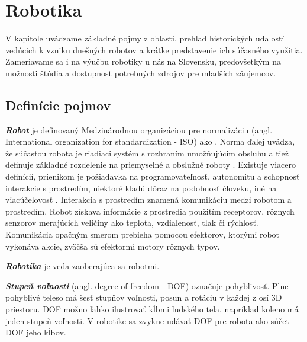 \chapter{Robotika}

\label{kap:robotika}

V kapitole uvádzame základné pojmy z oblasti, prehľad historických udalostí vedúcich k vzniku dnešných robotov a krátke predstavenie ich súčasného využitia. Zameriavame sa i na výučbu robotiky u nás na Slovensku, predovšetkým na možnosti štúdia a dostupnosť potrebných zdrojov pre mladších záujemcov.

\section{Definície pojmov}
\textbf{\textit{Robot}} je definovaný Medzinárodnou organizáciou pre normalizáciu (angl. International organization for standardization - ISO) ako . Norma ďalej uvádza, že súčasťou robota je riadiaci systém s rozhraním umožňujúcim obsluhu a tiež definuje základné rozdelenie na priemyselné a obslužné roboty \cite{ISORobot}. Existuje viacero definícií, prienikom je požiadavka na programovateľnosť, autonomitu a schopnosť interakcie s prostredím, niektoré kladú dôraz na podobnosť človeku, iné na viacúčelovosť \cite{RoboticsAndAutomationHandbook}. Interakcia s prostredím znamená komunikáciu medzi robotom a prostredím. Robot získava informácie z prostredia použitím receptorov, rôznych senzorov merajúcich veličiny ako teplota, vzdialenosť, tlak či rýchlosť. Komunikácia opačným smerom prebieha pomocou efektorov, ktorými robot vykonáva akcie, zväčša sú efektormi motory rôznych typov.

\textbf{\textit{Robotika}} je veda zaoberajúca sa robotmi.

\textbf{\textit{Stupeň voľnosti}} (angl. degree of freedom - DOF) označuje pohyblivosť. Plne pohyblivé teleso má šesť stupňov voľnosti, posun a rotáciu v každej z osí 3D priestoru. DOF možno ľahko ilustrovať kĺbmi ľudského tela, napríklad koleno má jeden stupeň voľnosti. V robotike sa zvykne udávať DOF pre robota ako súčet DOF jeho kĺbov.

